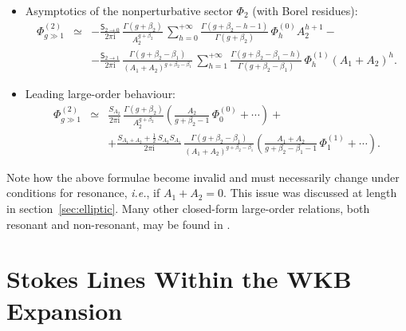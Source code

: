 \documentclass[11pt,a4paper]{article}
\newcommand{\bea}{\begin{eqnarray}}
\newcommand{\eea}{\end{eqnarray}}
\newcommand{\rmi}{{\mathrm{i}}}
\begin{document}
\begin{itemize}
%
\bea
\Phi_{g\gg1}^{(2)} &\simeq& \frac{S_{A_2}}{2\pi\rmi}\, \frac{\Gamma \left( g+\beta_2 \right)}{A_2^{g+\beta_2}}\, \sum_{h=0}^{+\infty} \frac{\Gamma \left( g+\beta_2-h-1 \right)}{\Gamma \left( g+\beta_2 \right)}\, \Phi_h^{(0)} A_2^{h+1} + \\
&&
\hspace{-20pt}
+ \frac{S_{A_1+A_2} + \frac{1}{2}\, S_{A_1} S_{A_2}}{2\pi\rmi}\, \frac{\Gamma \left( g+\beta_2-\beta_1 \right)}{\left(A_1+A_2\right)^{g+\beta_2-\beta_1}}\, \sum_{h=1}^{+\infty} \frac{\Gamma \left( g+\beta_2-\beta_1-h \right)}{\Gamma \left( g+\beta_2-\beta_1 \right)}\, \Phi_h^{(1)} \left(A_1+A_2\right)^h. \nonumber
\eea
%
\item Asymptotics of the nonperturbative sector $\Phi_2$ (with Borel residues):
%
\bea
\Phi_{g\gg1}^{(2)} &\simeq& -\frac{\mathsf{S}_{2\to0}}{2\pi\rmi}\, \frac{\Gamma \left( g+\beta_2 \right)}{A_2^{g+\beta_2}}\, \sum_{h=0}^{+\infty} \frac{\Gamma \left( g+\beta_2-h-1 \right)}{\Gamma \left( g+\beta_2 \right)}\, \Phi_h^{(0)} A_2^{h+1} - \\
&&
- \frac{\mathsf{S}_{2\to1}}{2\pi\rmi}\, \frac{\Gamma \left( g+\beta_2-\beta_1 \right)}{\left(A_1+A_2\right)^{g+\beta_2-\beta_1}}\, \sum_{h=1}^{+\infty} \frac{\Gamma \left( g+\beta_2-\beta_1-h \right)}{\Gamma \left( g+\beta_2-\beta_1 \right)}\, \Phi_h^{(1)} \left(A_1+A_2\right)^h. \nonumber
\eea
%
\item Leading large-order behaviour:
%
\bea
\Phi_{g\gg1}^{(2)} &\simeq& \frac{S_{A_2}}{2\pi\rmi}\, \frac{\Gamma \left( g+\beta_2 \right)}{A_2^{g+\beta_2}} \left( \frac{A_2}{g+\beta_2-1}\, \Phi_0^{(0)} + \cdots \right) + \\
&&
+ \frac{S_{A_1+A_2} + \frac{1}{2}\, S_{A_2} S_{A_1}}{2\pi\rmi}\, \frac{\Gamma \left( g+\beta_2-\beta_1 \right)}{\left(A_1+A_2\right)^{g+\beta_2-\beta_1}} \left( \frac{A_1+A_2}{g+\beta_2-\beta_1-1}\, \Phi_1^{(1)} + \cdots \right). \nonumber
\eea
%
\end{itemize}
%
\noindent
Note how the above formulae become invalid and must necessarily change under conditions for resonance, \textit{i.e.}, if $A_1+A_2=0$. This issue was discussed at length in section~\ref{sec:elliptic}. Many other closed-form large-order relations, both resonant and non-resonant, may be found in \cite{asv11}.


\section{Stokes Lines Within the WKB Expansion}\label{app:stokes}
\end{document}
